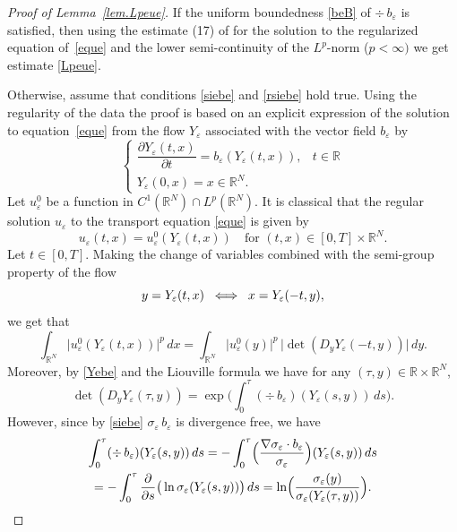 \documentclass[JEP,XML,SOM,Unicode]{cedram}
\newcommand\ssi{\mathchoice{\iff}{\Leftrightarrow}{\Leftrightarrow}{\Leftrightarrow}}
\def \RR {\mathbb R}
\theoremstyle{plain}
\theoremstyle{definition}
\begin{document}
\begin{proof}[Proof of Lemma~\ref{lem.Lpeue}]
If the uniform boundedness \eqref{beB} of $\div\,b_\varepsilon$ is satisfied, then using the estimate (17) of \cite[Prop.\,II.1]{DiLi} for the solution to the regularized equation of~\eqref{eque} and the lower semi-continuity of the $L^p$-norm ($p<\infty)$ we get estimate \eqref{Lpeue}.

Otherwise, assume that conditions \eqref{siebe} and \eqref{rsiebe} hold true.
Using the regularity of the data the proof is based on an explicit expression of the solution to equation~\eqref{eque} from the flow $Y_\varepsilon$ associated with the vector field $b_\varepsilon$ by
\begin{equation}\label{Yebe}
\begin{cases}
\dfrac{\partial Y_\varepsilon(t,x)}{\partial t}=b_\varepsilon(Y_\varepsilon(t,x)), & t\in\RR
\\[5pt]
Y_\varepsilon(0,x)=x\in\RR^N.
\end{cases}
\end{equation}
Let $u_\varepsilon^0$ be a function in $C^1(\RR^N)\cap L^p(\RR^N)$.
It is classical that the regular solution $u_\varepsilon$ to the transport equation \eqref{eque} is given by
\begin{equation}\label{ueXe}
u_\varepsilon(t,x)=u_\varepsilon^0(Y_\varepsilon(t,x))\quad\mbox{for }(t,x)\in[0,T]\times\RR^N.
\end{equation}
Let $t\in[0,T]$. Making the change of variables combined with the semi-group property of the flow
\[
y=Y_\varepsilon(t,x)\;\ssi\;x=Y_\varepsilon(-t,y),
\]
we get that
\begin{equation}\label{Lpeue01}
\int_{\RR^N}\big|u_\varepsilon^0(Y_\varepsilon(t,x))\big|^p\,dx=\int_{\RR^N}\big|u_\varepsilon^0(y)\big|^p\,\big|\det(D_y Y_\varepsilon(-t,y))\big|\,dy.
\end{equation}
Moreover, by \eqref{Yebe} and the Liouville formula we have for any $(\tau,y)\in\RR\times\RR^N$,
\[
\det(D_y Y_\varepsilon(\tau,y))=\exp\biggl(\int_0^{\tau}(\div\,b_\varepsilon)(Y_\varepsilon(s,y))\,ds\biggr).
\]
However, since by \eqref{siebe} $\sigma_\varepsilon\,b_\varepsilon$ is divergence free, we have
\begin{multline*}
 \int_0^{\tau}(\div\,b_\varepsilon)(Y_\varepsilon(s,y))\,ds=-\int_0^{\tau}\Bigl(\dfrac{\nabla\sigma_\varepsilon\cdot b_\varepsilon}{\sigma_\varepsilon}\Bigr)(Y_\varepsilon(s,y))\,ds
\\
=-\int_0^{\tau} \dfrac{\partial}{\partial s}\big(\ln \sigma_\varepsilon(Y_\varepsilon(s,y))\big)\,ds=\ln\Bigl(\dfrac{\sigma_\varepsilon(y)}{\sigma_\varepsilon(Y_\varepsilon(\tau,y))}\Bigr).

\end{multline*}
\end{proof}
\end{document}
